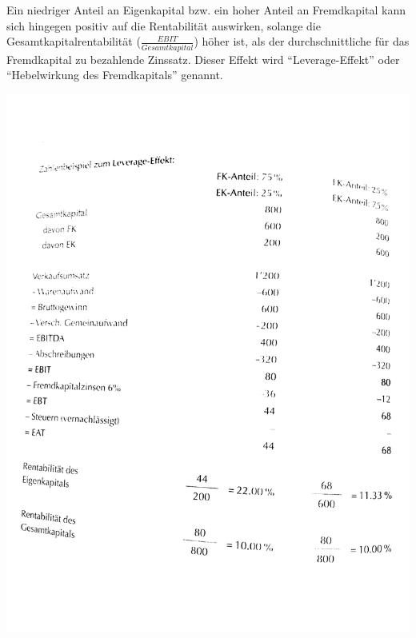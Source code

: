 Ein niedriger Anteil an Eigenkapital bzw. ein hoher Anteil an Fremdkapital
kann sich hingegen positiv auf die Rentabilität auswirken, solange
die Gesamtkapitalrentabilität ($\frac{EBIT}{Gesamtkapital}$) höher
ist, als der durchschnittliche für das Fremdkapital zu bezahlende
Zinssatz. Dieser Effekt wird ``Leverage-Effekt'' oder ``Hebelwirkung
des Fremdkapitals'' genannt.

\includegraphics[width=17cm]{AnalyseJahresabschluss/Leverage}
